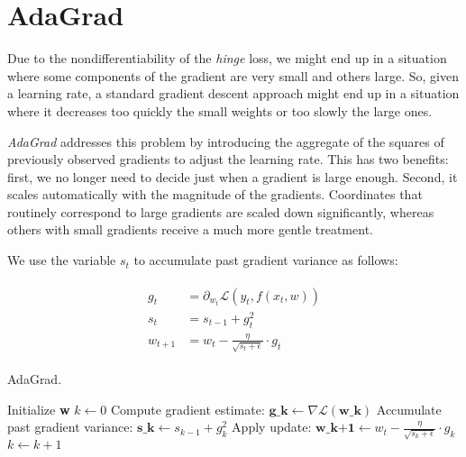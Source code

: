 \section{AdaGrad}

Due to the nondifferentiability of the \emph{hinge} loss, we might end up in a situation where some components of the gradient are very small and others large. So, given a learning rate, a standard gradient descent approach might end up in a situation where it decreases too quickly the small weights or too slowly the large ones.

\emph{AdaGrad} \cite{duchi2011adaptive} addresses this problem by introducing the aggregate of the squares of previously observed gradients to adjust the learning rate. This has two benefits: first, we no longer need to decide just when a gradient is large enough. Second, it scales automatically with the magnitude of the gradients. Coordinates that routinely correspond to large gradients are scaled down significantly, whereas others with small gradients receive a much more gentle treatment.

We use the variable $s_t$ to accumulate past gradient variance as follows:
	
\begin{equation} \label{eq:adagrad}
	\begin{split}
    	\begin{aligned}
        	g_t & = \partial_{{w_t}} \mathcal{L}(y_t, f(x_t, w)) \\
        	s_t & = s_{t-1} + g_t^2 \\
        	w_{t+1} & = w_t - \frac{\eta}{\sqrt{s_t + \epsilon}} \cdot g_t
    	\end{aligned}
	\end{split}
\end{equation}

\begin{algorithm}[h!]
	\caption{AdaGrad.}
	\label{alg:adagrad}
	\begin{algorithmic}[1]
			\State Initialize \textbf{w}
			\State $k \gets 0$
				\State Compute gradient estimate: $\textbf{g_k} \gets \nabla \mathcal{L}(\textbf{w_k})$
				\State Accumulate past gradient variance: $\textbf{s_k} \gets s_{k-1} + g_k^2$
				\State Apply update: $\textbf{w_{k+1}} \gets w_t - \frac{\eta}{\sqrt{s_k + \epsilon}} \cdot g_k$
				\State $k \gets k + 1$
			\EndWhile
		\EndProcedure
	\end{algorithmic}
\end{algorithm}
